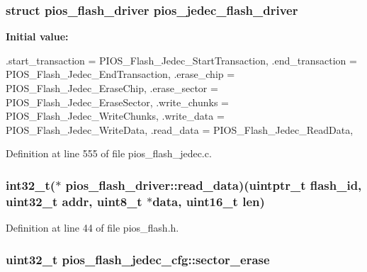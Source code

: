 \hypertarget{group___p_i_o_s___f_l_a_s_h_gab3923a09f07a535164fd799434276f27}{
\subsubsection[{pios\-\_\-jedec\-\_\-flash\-\_\-driver}]{\setlength{\rightskip}{0pt plus 5cm}struct {\bf pios\-\_\-flash\-\_\-driver} {\bf pios\-\_\-jedec\-\_\-flash\-\_\-driver}}}\label{group___p_i_o_s___f_l_a_s_h_gab3923a09f07a535164fd799434276f27}
{\bfseries \-Initial value\-:}
\begin{DoxyCode}
 {
        .start_transaction = PIOS_Flash_Jedec_StartTransaction,
        .end_transaction   = PIOS_Flash_Jedec_EndTransaction,
        .erase_chip        = PIOS_Flash_Jedec_EraseChip,
        .erase_sector      = PIOS_Flash_Jedec_EraseSector,
        .write_chunks      = PIOS_Flash_Jedec_WriteChunks,
        .write_data        = PIOS_Flash_Jedec_WriteData,
        .read_data         = PIOS_Flash_Jedec_ReadData,
}
\end{DoxyCode}


\-Definition at line 555 of file pios\-\_\-flash\-\_\-jedec.\-c.

\hypertarget{group___p_i_o_s___f_l_a_s_h_ga5499ff7cdf896098a6eb43f2f32dc40a}{
\subsubsection[{read\-\_\-data}]{\setlength{\rightskip}{0pt plus 5cm}int32\-\_\-t($\ast$ {\bf pios\-\_\-flash\-\_\-driver\-::read\-\_\-data})(uintptr\-\_\-t flash\-\_\-id, uint32\-\_\-t addr, uint8\-\_\-t $\ast$data, uint16\-\_\-t len)}}\label{group___p_i_o_s___f_l_a_s_h_ga5499ff7cdf896098a6eb43f2f32dc40a}


\-Definition at line 44 of file pios\-\_\-flash.\-h.

\hypertarget{group___p_i_o_s___f_l_a_s_h_gae824eeb4a55e49fa84a48f1d43ae788c}{
\subsubsection[{sector\-\_\-erase}]{\setlength{\rightskip}{0pt plus 5cm}uint32\-\_\-t {\bf pios\-\_\-flash\-\_\-jedec\-\_\-cfg\-::sector\-\_\-erase}}}\label{group___p_i_o_s___f_l_a_s_h_gae824eeb4a55e49fa84a48f1d43ae788c}



